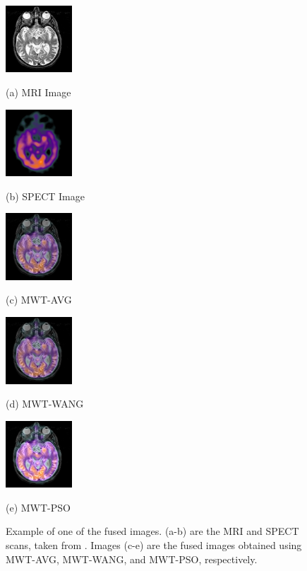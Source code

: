 \documentclass{article}
\begin{document}
\begin{figure}[tb]
    \begin{minipage}[b]{0.48\linewidth}
      \centering
      \centerline{\includegraphics[height = 2.5cm]{Img/S020_MRI.png}}
      \centerline{(a) MRI Image}\medskip
    \end{minipage}
    \hfill
    \begin{minipage}[b]{0.48\linewidth}
      \centering
      \centerline{\includegraphics[height = 2.5cm]{Img/S020_SPECT.png}}
      \centerline{(b) SPECT Image}\medskip
    \end{minipage}
    
    \begin{minipage}[b]{0.31\linewidth}
      \centering
      \centerline{\includegraphics[height = 2.5cm]{Img/S020_Fused_MWT_No_PSO_AVG.png}}
      \centerline{(c) MWT-AVG}\medskip
    \end{minipage}
    \hfill
    \begin{minipage}[b]{0.31\linewidth}
      \centering
      \centerline{\includegraphics[height = 2.5cm]{Img/S020_Fused_MWT_No_PSO_WANG.png}}
      \centerline{(d) MWT-WANG}\medskip
    \end{minipage}
    \hfill
    \begin{minipage}[b]{0.31\linewidth}
      \centering
      \centerline{\includegraphics[height = 2.5cm]{Img/S020_Fused_MWT_PSO_Grp.png}}
      \centerline{(e) MWT-PSO}\medskip
    \end{minipage}
    
    \caption{Example of one of the fused images. (a-b) are the MRI and SPECT scans, taken from \cite{HarvardBrain}. Images (c-e) are the fused images obtained using MWT-AVG, MWT-WANG, and MWT-PSO, respectively.}
    \label{fig:ImgFusion}
\end{figure}
\end{document}
